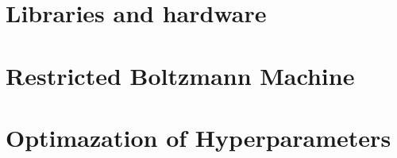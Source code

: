 \chapter{Libraries and hardware}
%

\chapter{Restricted Boltzmann Machine}

\chapter{Optimazation of Hyperparameters}

